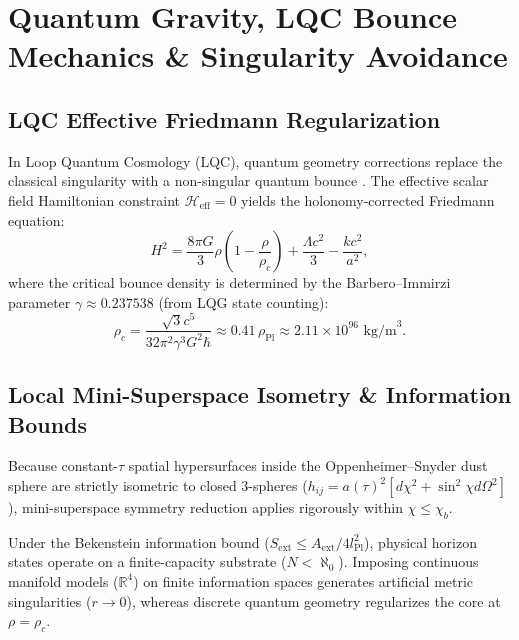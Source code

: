 \documentclass[11pt,a4paper]{article}
\begin{document}
\section{Quantum Gravity, LQC Bounce Mechanics \& Singularity Avoidance}\label{sec:lqc_bounce}

\subsection{LQC Effective Friedmann Regularization}\label{sec:lqc_friedmann}
In Loop Quantum Cosmology (LQC), quantum geometry corrections replace the classical singularity with a non-singular quantum bounce \cite{ashtekar2006, ashtekar2011}. The effective scalar field Hamiltonian constraint $\mathcal{H}_{\text{eff}} = 0$ yields the holonomy-corrected Friedmann equation:
\begin{equation}\label{eq:lqc_friedmann}
    H^2 = \frac{8\pi G}{3}\rho \left(1 - \frac{\rho}{\rho_c}\right) + \frac{\Lambda c^2}{3} - \frac{k c^2}{a^2},
\end{equation}
where the critical bounce density is determined by the Barbero--Immirzi parameter $\gamma \approx 0.237538$ (from LQG state counting):
\begin{equation}\label{eq:critical_density}
    \rho_c = \frac{\sqrt{3} c^5}{32\pi^2 \gamma^3 G^2 \hbar} \approx 0.41 \, \rho_{\text{Pl}} \approx 2.11 \times 10^{96} \text{ kg/m}^3.
\end{equation}

\subsection{Local Mini-Superspace Isometry \& Information Bounds}\label{sec:minisuperspace}
Because constant-$\tau$ spatial hypersurfaces inside the Oppenheimer--Snyder dust sphere are strictly isometric to closed 3-spheres ($h_{ij} = a(\tau)^2 [d\chi^2 + \sin^2\chi d\Omega^2]$), mini-superspace symmetry reduction applies rigorously within $\chi \le \chi_b$.

Under the Bekenstein information bound ($S_{\text{ext}} \le A_{\text{ext}}/4l_{\text{Pl}}^2$), physical horizon states operate on a finite-capacity substrate ($N < \aleph_0$). Imposing continuous manifold models ($\mathbb{R}^4$) on finite information spaces generates artificial metric singularities ($r \to 0$), whereas discrete quantum geometry regularizes the core at $\rho = \rho_c$.
\end{document}
